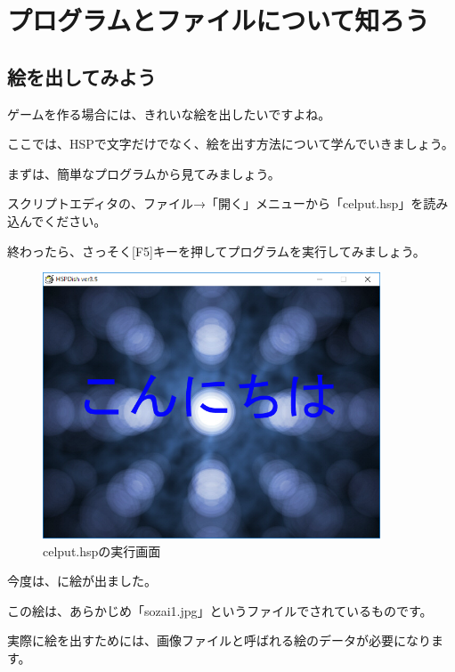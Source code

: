 \newpage
\section{プログラムとファイルについて知ろう}


\subsection{絵を出してみよう}


ゲームを作る場合には、きれいな絵を出したいですよね。

ここでは、HSPで文字だけでなく、絵を出す方法について学んでいきましょう。

\bigskip

まずは、簡単なプログラムから見てみましょう。

スクリプトエディタの、ファイル→「開く」メニューから「celput.hsp」を読み込んでください。

終わったら、さっそく[F5]キーを押してプログラムを実行してみましょう。


\begin{figure}[H]
    \begin{center}
      \includegraphics[keepaspectratio,width=10.028cm,height=7.909cm]{text04-img/s_celput.png}
      \caption{celput.hspの実行画面}
    \end{center}
    \label{fig:prog_menu}
\end{figure}


今度は、に絵が出ました。

この絵は、あらかじめ「sozai1.jpg」というファイルでされているものです。

実際に絵を出すためには、画像ファイルと呼ばれる絵のデータが必要になります。

